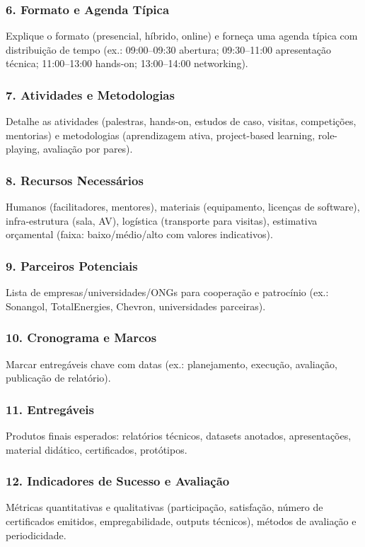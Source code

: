 \documentclass[12pt,a4paper]{article}
\begin{document}
\subsubsection*{6. Formato e Agenda Típica}
Explique o formato (presencial, híbrido, online) e forneça uma agenda típica com distribuição de tempo (ex.: 09:00–09:30 abertura; 09:30–11:00 apresentação técnica; 11:00–13:00 hands-on; 13:00–14:00 networking).

\subsubsection*{7. Atividades e Metodologias}
Detalhe as atividades (palestras, hands-on, estudos de caso, visitas, competições, mentorias) e metodologias (aprendizagem ativa, project-based learning, role-playing, avaliação por pares).

\subsubsection*{8. Recursos Necessários}
Humanos (facilitadores, mentores), materiais (equipamento, licenças de software), infra-estrutura (sala, AV), logística (transporte para visitas), estimativa orçamental (faixa: baixo/médio/alto com valores indicativos).

\subsubsection*{9. Parceiros Potenciais}
Lista de empresas/universidades/ONGs para cooperação e patrocínio (ex.: Sonangol, TotalEnergies, Chevron, universidades parceiras).

\subsubsection*{10. Cronograma e Marcos}
Marcar entregáveis chave com datas (ex.: planejamento, execução, avaliação, publicação de relatório).

\subsubsection*{11. Entregáveis}
Produtos finais esperados: relatórios técnicos, datasets anotados, apresentações, material didático, certificados, protótipos.

\subsubsection*{12. Indicadores de Sucesso e Avaliação}
Métricas quantitativas e qualitativas (participação, satisfação, número de certificados emitidos, empregabilidade, outputs técnicos), métodos de avaliação e periodicidade.
\end{document}
